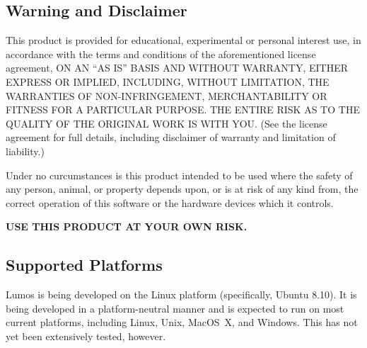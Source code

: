 \documentclass{article}
\begin{document}
\subsection{Warning and Disclaimer}
This product is provided for educational, experimental or personal
interest use, in accordance with the terms and conditions of the
aforementioned license agreement, ON AN ``AS IS'' BASIS AND WITHOUT
WARRANTY, EITHER EXPRESS OR IMPLIED, INCLUDING, WITHOUT LIMITATION,
THE WARRANTIES OF NON-INFRINGEMENT, MERCHANTABILITY OR FITNESS FOR A
PARTICULAR PURPOSE. THE ENTIRE RISK AS TO THE QUALITY OF THE ORIGINAL
WORK IS WITH YOU.  (See the license agreement for full details, 
including disclaimer of warranty and limitation of liability.)

Under no curcumstances is this product intended to be used where the
safety of any person, animal, or property depends upon, or is at
risk of any kind from, the correct operation of this software or
the hardware devices which it controls.

{\bf USE THIS PRODUCT AT YOUR OWN RISK.}

\subsection{Supported Platforms}
Lumos is being developed on the Linux platform (specifically, Ubuntu 8.10).
It is being developed in a platform-neutral manner and is expected to run on
most current platforms, including Linux, Unix, MacOS~X, and Windows.  This
has not yet been extensively tested, however.
\end{document}
